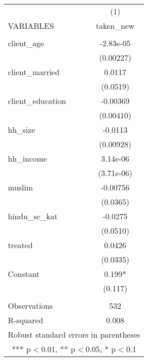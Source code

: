 \begin{tabular}{lc} \hline
 & (1) \\
VARIABLES & taken\_new \\ \hline
 &  \\
client\_age & -2.83e-05 \\
 & (0.00227) \\
client\_married & 0.0117 \\
 & (0.0519) \\
client\_education & -0.00369 \\
 & (0.00410) \\
hh\_size & -0.0113 \\
 & (0.00928) \\
hh\_income & 3.14e-06 \\
 & (3.71e-06) \\
muslim & -0.00756 \\
 & (0.0365) \\
hindu\_sc\_kat & -0.0275 \\
 & (0.0510) \\
treated & 0.0426 \\
 & (0.0335) \\
Constant & 0.199* \\
 & (0.117) \\
 &  \\
Observations & 532 \\
 R-squared & 0.008 \\ \hline
\multicolumn{2}{c}{ Robust standard errors in parentheses} \\
\multicolumn{2}{c}{ *** p$<$0.01, ** p$<$0.05, * p$<$0.1} \\
\end{tabular}
